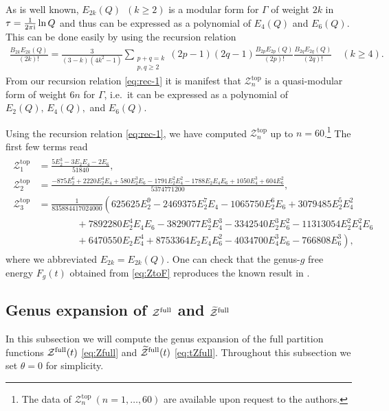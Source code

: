 \documentclass[11pt]{article}
\newcommand{\ri}{{\rm i}}
\def\Ga{\Gamma}
\newcommand{\Ztop}{\mathcal{Z}^{\text{top}}}
\renewcommand{\[}{\begin{eqnarray}}
\renewcommand{\]}{\end{eqnarray}}
\newcommand{\Zefull}{{\cal Z}^{\text{full}}}
\newcommand{\Zofull}{{\widetilde{\cal Z}}^{\text{full}}}
\begin{document}
As is well known, $E_{2k}(Q)$~$(k\geq2)$ is a modular form for $\Gamma$ of
weight $2k$ in $\tau=\frac{1}{2\pi\ri}\ln Q$
and thus can be expressed as a polynomial of $E_4(Q)$ and $E_6(Q)$.
This can be done easily by using the recursion relation
%
\begin{align}
\frac{B_{2k}E_{2k}(Q)}{(2k)!}
 =\frac{3}{(3-k)(4k^2-1)}\sum_{\substack{p+q=k\\ p,q\ge 2}}
(2p-1)(2q-1)\frac{B_{2p}E_{2p}(Q)}{(2p)!}\frac{B_{2q}E_{2q}(Q)}{(2q)!}
\quad (k\ge 4).
\end{align}
%
From our recursion relation \eqref{eq:rec-1} it is manifest that
$\Ztop_n$ is a quasi-modular form of weight $6n$ for $\Ga$,
i.e.~it can be expressed as a polynomial of $E_2(Q),\,E_4(Q),$ and $E_6(Q)$.

Using the recursion relation \eqref{eq:rec-1}, we have computed $\Ztop_n$ up to $n=60$.\footnote{
The data
of $\Ztop_n~(n=1,\ldots,60)$ are available upon request to the authors.}
The first few terms read
\begin{align}
\begin{aligned}
\Ztop_1&=\frac{5 E_2^3-3 E_2 E_4 -2 E_6}{51840},\\
\Ztop_2&= \frac{-875 E_2^6+2220 E_2^4 E_4 +580 E_2^3 E_6 -1791
   E_2^2 E_4^2 -1788 E_2 E_4 E_6 +1050 E_4^3+604
   E_6^2}{5374771200},\\
\Ztop_3&=\frac{1}{835884417024000}
\left(
 625625E_2^9-2469375E_2^7E_4-1065750E_2^6E_6+3079485E_2^5E_4^2\right.\\
&\left.\hspace{4em}
 +7892280E_2^4E_4E_6-3829077E_2^3E_4^3-3342540E_2^3E_6^2
 -11313054E_2^2E_4^2E_6\right.\\
&\left.\hspace{4em}
 +6470550E_2E_4^4+8753364E_2E_4E_6^2
 -4034700E_4^3E_6-766808E_6^3
\right),
\end{aligned}
\end{align}
where we abbreviated $E_{2k}=E_{2k}(Q)$.
One can check that the genus-$g$ free energy $F_{g}(t)$ obtained from 
\eqref{eq:ZtoF} reproduces the known result in \cite{Douglas:1993wy,Rudd:1994ta}.

\subsection{Genus expansion of $\Zefull$ and $\Zofull$ \label{subsec:genus-full}}

In this subsection we will compute the genus expansion of
the full partition functions $\Zefull(t)$ \eqref{eq:Zfull} and $\Zofull(t)$
\eqref{eq:tZfull}.
Throughout this subsection we set $\theta=0$ for simplicity.
\end{document}
